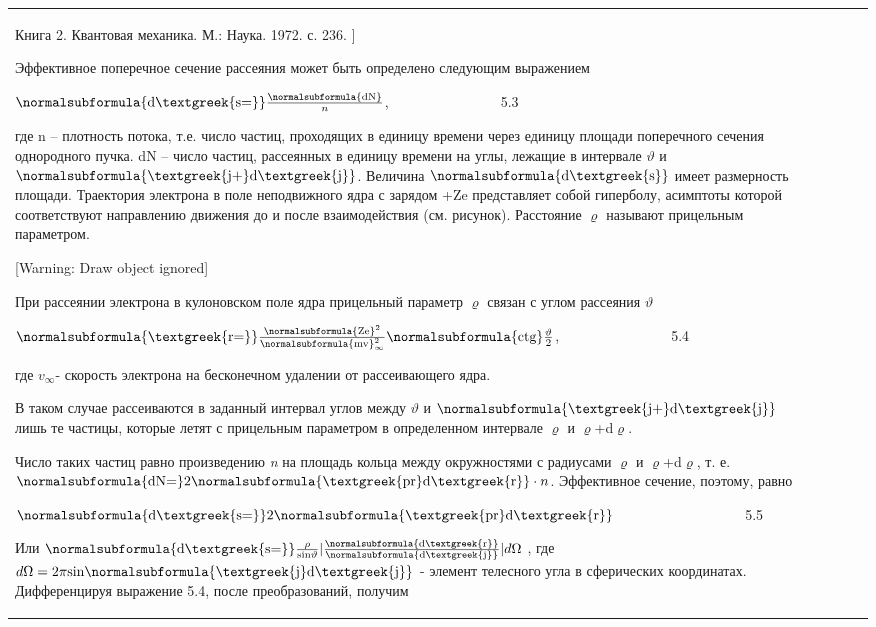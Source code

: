 \documentclass[a4paper,14pt, openany, twoside, draft]{extbook} %
\begin{document}
\begin{flushleft}
\begin{supertabular}{|m{1.7279999cm}|m{1.522cm}|m{1.522cm}|m{1.522cm}|m{1.744cm}|}
 Книга 2. Квантовая механика. М.: Наука. 1972. с. 236. ]

Эффективное поперечное сечение рассеяния может быть определено следующим выражением

 $\normalsubformula{\text{d\textgreek{s=}}}\frac{\normalsubformula{\text{dN}}} n$,\ \ \ \ \ \ \ \ \ \ \ \ \ \ \ \ 5.3

где n – плотность потока, т.е. число частиц, проходящих в единицу времени через единицу площади поперечного сечения однородного пучка. dN – число частиц, рассеянных в единицу времени на углы, лежащие в интервале  $\vartheta $ и  $\normalsubformula{\text{\textgreek{j+}d\textgreek{j}}}$. Величина  $\normalsubformula{\text{d\textgreek{s}}}$ имеет размерность площади. Траектория электрона в поле неподвижного ядра с зарядом +Ze представляет собой гиперболу, асимптоты которой соответствуют направлению движения до и после взаимодействия (см. рисунок). Расстояние ${\varrho}$ называют прицельным параметром.

[Warning: Draw object ignored]

При рассеянии электрона в кулоновском поле ядра прицельный параметр ${\varrho}$ связан с углом рассеяния ${\vartheta}$

 $\normalsubformula{\text{\textgreek{r=}}}\frac{\normalsubformula{\text{Ze}}^2}{\normalsubformula{\text{mv}}_{\infty }^2}\normalsubformula{\text{ctg}}\frac{\vartheta } 2$,\ \ \ \ \ \ \ \ \ \ \ \ \ \ \ \ 5.4

где  $v_{\infty }${}- скорость электрона на бесконечном удалении от рассеивающего ядра.

В таком случае рассеиваются в заданный интервал углов между  $\vartheta $ и  $\normalsubformula{\text{\textgreek{j+}d\textgreek{j}}}$ лишь те частицы, которые летят с прицельным параметром в определенном интервале ${\varrho}$ и ${\varrho}$+d${\varrho}$.

Число таких частиц равно произведению \emph{n} на площадь кольца между окружностями с радиусами ${\varrho}$ и ${\varrho}$+d${\varrho}$, т. е.  $\normalsubformula{\text{dN=}}2\normalsubformula{\text{\textgreek{pr}d\textgreek{r}}}\cdot n$. Эффективное сечение, поэтому, равно

 $\normalsubformula{\text{d\textgreek{s=}}}2\normalsubformula{\text{\textgreek{pr}d\textgreek{r}}}$ \ \ \ \ \ \ \ \ \ \ \ \ \ \ \ \ \ \ 5.5

Или  $\normalsubformula{\text{d\textgreek{s=}}}\frac{\rho }{\text{sin}\vartheta }|\frac{\normalsubformula{\text{d\textgreek{r}}}}{\normalsubformula{\text{d\textgreek{j}}}}|d\Omega $ , где  $d\Omega =2\pi \text{sin}\normalsubformula{\text{\textgreek{j}d\textgreek{j}}}$ - элемент телесного угла в сферических координатах. Дифференцируя выражение 5.4, после преобразований, получим


\end{supertabular}
\end{flushleft}
\end{document}
